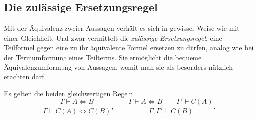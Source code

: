 \newpage
\subsection{Die zulässige Ersetzungsregel}

Mit der Äquivalenz zweier Aussagen verhält es sich in gewisser Weise
wie mit einer Gleichheit. Und zwar vermittelt die \emph{zulässige
Ersetzungsregel}, eine Teilformel gegen eine zu ihr äquivalente
Formel ersetzen zu dürfen, analog wie bei der Termumformung eines
Teilterms. Sie ermöglicht die bequeme Äquivalenzumformung von
Aussagen, womit man sie als besonders nützlich erachten darf.

\begin{Satz}%
\newlinefirst
Es gelten die beiden gleichwertigen Regeln
\[\dfrac{\Gamma\vdash A\Leftrightarrow B}
{\Gamma\vdash C(A)\Leftrightarrow C(B)},\qquad
\dfrac{\Gamma\vdash A\Leftrightarrow B\qquad\Gamma'\vdash C(A)}
{\Gamma,\Gamma'\vdash C(B)}.\]
\end{Satz}
